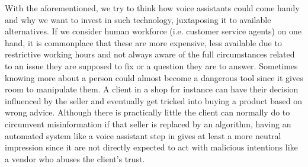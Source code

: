%
With the aforementioned, we try to think how voice assistants could come handy and why we want to invest in such technology, juxtaposing it to available alternatives.
If we consider human workforce (i.e. customer service agents) on one hand, it is commonplace that these are more expensive, less available due to restrictive working hours and not always aware of the full circumstances related to an issue they are supposed to fix or a question they are to answer. 
Sometimes knowing more about a person could almost become a dangerous tool since it gives room to manipulate them. 
A client in a shop for instance can have their decision influenced by the seller and eventually get tricked into buying a product based on wrong advice.
Although there is practically little the client can normally do to circumvent misinformation if that seller is replaced by an algorithm, having an automated system like a voice assistant step in gives at least a more neutral impression since it are not directly expected to act with malicious intentions like a vendor who abuses the client's trust.

